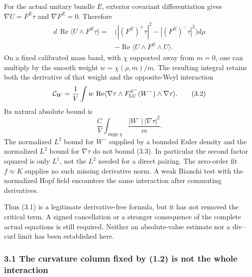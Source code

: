 \documentclass[
  10pt,
]{article}
\begin{document}
For the actual unitary bundle \(E\), exterior covariant differentiation
gives \(\nabla U=F^E\tau\) and \(\nabla F^E=0\). Therefore \[
\begin{aligned}
 d\,\operatorname{Re}\langle U\wedge F^E\tau\rangle
  ={}&\bigl(|(F^E)^+\tau|^2-|(F^E)^-\tau|^2\bigr)d\mu\\
     &-\operatorname{Re}\langle U\wedge F^E\wedge U\rangle .
\end{aligned}                                                   \tag{3.1}
\] On a fixed calibrated mass band, with \(\chi\) supported away from
\(m=0\), one can multiply by the smooth weight \(w=\chi(\rho,m)/m\). The
resulting integral retains both the derivative of that weight and the
opposite-Weyl interaction \[
 \mathcal C_W=\frac1V\int w\,
  \operatorname{Re}\langle\nabla\tau\wedge
      F_{\rm LC}^{S^-}(W^-)\wedge\nabla\tau\rangle .     \tag{3.2}
\] Its natural absolute bound is \[
 \frac C V\int_{\operatorname{supp}\chi}
       \frac{|W^-|\,|\nabla\tau|^2}{m}.               \tag{3.3}
\] The normalized \(L^2\) bound for \(W^-\) supplied by a bounded Euler
density and the normalized \(L^2\) bound for \(\nabla\tau\) do not bound
(3.3). In particular the second factor squared is only \(L^1\), not the
\(L^2\) needed for a direct pairing. The zero-order fit \(f\approx K\)
supplies no such missing derivative norm. A weak Bianchi test with the
normalized Hopf field encounters the same interaction after commuting
derivatives.

Thus (3.1) is a legitimate derivative-free formula, but it has not
removed the critical term. A signed cancellation or a stronger
consequence of the complete actual equations is still required. Neither
an absolute-value estimate nor a div--curl limit has been established
here.

\hypertarget{the-curvature-column-fixed-by-1.2-is-not-the-whole-interaction}{%
\subsubsection{3.1 The curvature column fixed by (1.2) is not the whole
interaction}\label{the-curvature-column-fixed-by-1.2-is-not-the-whole-interaction}}
\end{document}
